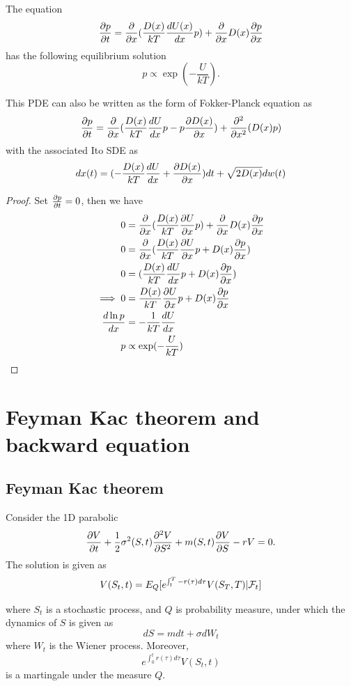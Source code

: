 \begin{refsection}
\begin{lemma}
	The equation
	$$\frac{\partial p}{\partial t} = \frac{\partial }{\partial x}(\frac{D(x)}{kT} \frac{d U(x)}{d x} p)+\frac{\partial }{\partial x}D(x)\frac{\partial p}{\partial x}$$	
	has the following equilibrium solution
	$$p \propto \exp(-\frac{U}{kT}).$$
	
	This PDE can also be written as the form of Fokker-Planck equation as
	$$\frac{\partial p}{\partial t}  = \frac{\partial}{\partial x}(\frac{D(x)}{kT} \frac{d U}{d x}p -p\frac{\partial D(x)}{\partial  x})+\frac{\partial^2}{\partial x^2} (D(x)p)$$
	with the associated Ito SDE as
	$$dx(t)=(-\frac{D(x)}{kT} \frac{d U}{d x} + \frac{\partial D(x)}{\partial x })dt + \sqrt{2D(x)}dw(t)$$
\end{lemma}
\begin{proof}
	Set $\frac{\partial p}{\partial t} = 0$, then we have
	\begin{align*}
	0 &= \frac{\partial }{\partial x}(\frac{D(x)}{kT} \frac{\partial U}{\partial x} p)+\frac{\partial }{\partial x}D(x)\frac{\partial p}{\partial x} \\
	0 &=\frac{\partial}{\partial x}(\frac{D(x)}{kT} \frac{\partial U}{\partial x} p + D(x)\frac{\partial p}{\partial x}) \\
	0 &=(\frac{D(x)}{kT} \frac{d U}{d x} p + D(x)\frac{\partial p}{\partial x}) \\
	\implies  0&=\frac{D(x)}{kT} \frac{\partial U}{\partial x} p + D(x)\frac{\partial p}{\partial x}\\
	\frac{d \ln p}{dx} &= -\frac{1}{kT}\frac{dU}{dx}\\
	p &\propto \exp(-\frac{U}{kT})
	\end{align*}
\end{proof}





\section{Feyman Kac theorem and backward equation}
\subsection{Feyman Kac theorem}
\begin{theorem}\label{ch:theory-of-stochastic-process:th:oneDFeymanKac}
	Consider the 1D parabolic 
	$$\frac{\partial V}{\partial t} + \frac{1}{2}\sigma^2(S,t) \frac{\partial^2 V}{\partial S^2} + m(S,t)\frac{\partial V}{\partial S} - rV = 0.$$
	The solution is given as
	$$V(S_t,t) = E_Q[e^{\int_t ^T -r(\tau) d\tau}V(S_T,T)|\mathcal{F}_t]$$
	
	where $S_t$ is a stochastic process, and $Q$ is probability measure, under which the dynamics of $S$ is given as
	$$dS = m dt + \sigma dW_t$$ 
	where $W_t$ is the Wiener process.
	Moreover, $$e^{\int_0^t r(\tau) d\tau}V(S_t,t)$$
	is a martingale under the measure $Q$.
\end{theorem}


\end{refsection}
